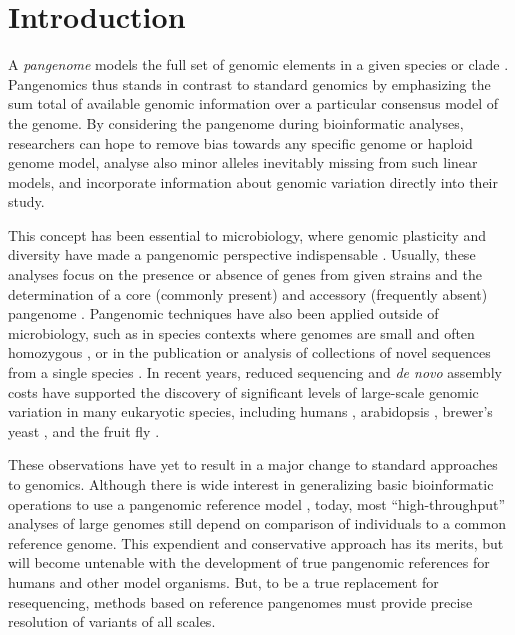 \section{Introduction}

A \emph{pangenome} models the full set of genomic elements in a given species or clade \cite{sigaux2000cancer}.
Pangenomics thus stands in contrast to standard genomics by emphasizing the sum total of available genomic information over a particular consensus model of the genome.
By considering the pangenome during bioinformatic analyses, researchers can hope to remove bias towards any specific genome or haploid genome model, analyse also minor alleles inevitably missing from such linear models, and incorporate information about genomic variation directly into their study.

This concept has been essential to microbiology, where genomic plasticity and diversity have made a pangenomic perspective indispensable \cite{tettelin2005genome,medini2005microbial}.
Usually, these analyses focus on the presence or absence of genes from given strains and the determination of a core (commonly present) and accessory (frequently absent) pangenome \cite{page2015roary}.
Pangenomic techniques have also been applied outside of microbiology, such as in species contexts where genomes are small and often homozygous \cite{cao2011whole}, or in the publication or analysis of collections of novel sequences from a single species \cite{gao2019tomato,brohammer2018maize}.
In recent years, reduced sequencing and \emph{de novo} assembly costs have supported the discovery of significant levels of large-scale genomic variation in many eukaryotic species, including humans \cite{li2010building,sudmant2010,sudmant2015integrated,Hehir-Kwa2016-hb,chaisson2018multi,Audano_2019,Yang_2019}, arabidopsis \cite{alonso2016arabidopsis}, brewer's yeast \cite{yue2017contrasting}, and the fruit fly \cite{chakraborty2018hidden}.

These observations have yet to result in a major change to standard approaches to genomics.
Although there is wide interest in generalizing basic bioinformatic operations to use a pangenomic reference model \cite{computational2016computational}, today, most ``high-throughput'' analyses of large genomes still depend on comparison of individuals to a common reference genome.
This expendient and conservative approach has its merits, but will become untenable with the development of true pangenomic references for humans \cite{Church2015-vt} and other model organisms.
But, to be a true replacement for resequencing, methods based on reference pangenomes must provide precise resolution of variants of all scales. %

